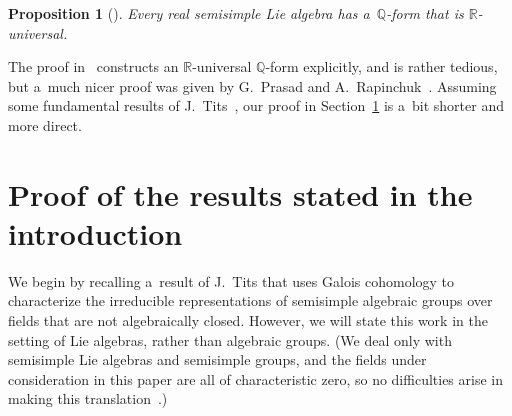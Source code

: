 \documentclass[11pt]{article}
\numberwithin{equation}{section}
\newtheorem{prop}{Proposition}[section]
\begin{document}
\begin{prop}[]\label{HasRUniv}
Every real semisimple Lie algebra has a~$\mathbb{Q}$-form that is $\mathbb{R}$-universal.
\end{prop}

The proof in~\cite{Morris-RRepsQForms} constructs an $\mathbb{R}$-universal $\mathbb{Q}$-form explicitly, and is rather
tedious, but a~much nicer proof was given by G.~Prasad and A.~Rapinchuk~\cite[Proposition~3 and Remark~3]{PrasadRapinchuk-Prescribed}.
Assuming some fundamental results of J.~Tits~\cite{Tits-RepLinIrred}, our proof in Section~\ref{PfSect} is a~bit shorter and
more direct.
\setcounter{section}{1}
\setcounter{subsection}{0}
\setcounter{subsubsection}{0}
\setcounter{equation}{0}
\section{Proof of the results stated in the introduction}\label{PfSect}

We begin by recalling a~result of J.~Tits that uses Galois cohomology to characterize the irreducible representations of
semisimple algebraic groups over f\/ields that are not algebraically closed.
However, we will state this work in the setting of Lie algebras, rather than algebraic groups.
(We deal only with semisimple Lie algebras and semisimple groups, and the f\/ields under consideration in this paper are
all of characteristic zero, so no dif\/f\/iculties arise in making this translation~\cite[Proposition~7.3.1(iii), p.~393]{DemazureGrothendieck-SGA3}.)
\end{document}
